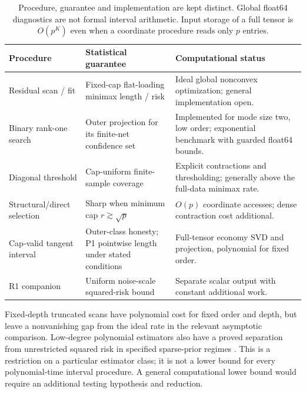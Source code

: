 \documentclass[11pt]{article}
\begin{document}
\begin{table}[t]\small\centering
\begin{tabularx}{\textwidth}{@{}lYY@{}}\toprule
Procedure & Statistical guarantee & Computational status \\\midrule
Residual scan / fit & Fixed-cap flat-loading minimax length / risk & Ideal global nonconvex optimization; general implementation open.\\
Binary rank-one search & Outer projection for its finite-net confidence set & Implemented for mode size two, low order; exponential benchmark with guarded float64 bounds.\\
Diagonal threshold & Cap-uniform finite-sample coverage & Explicit contractions and thresholding; generally above the full-data minimax rate.\\
Structural/direct selection & Sharp when minimum cap $r\gtrsim\sqrt p$ & $O(p)$ coordinate accesses; dense contraction cost additional.\\
Cap-valid tangent interval & Outer-class honesty; P1 pointwise length under stated conditions & Full-tensor economy SVD and projection, polynomial for fixed order.\\
R1 companion & Uniform noise-scale squared-risk bound & Separate scalar output with constant additional work.\\\bottomrule
\end{tabularx}
\caption{Procedure, guarantee and implementation are kept distinct. Global float64 diagnostics are not formal interval arithmetic. Input storage of a full tensor is $O(p^K)$ even when a coordinate procedure reads only $p$ entries.}\label{tab:methods}
\end{table}

Fixed-depth truncated scans have polynomial cost for fixed order and depth, but leave a nonvanishing gap from the ideal rate in the relevant asymptotic comparison. Low-degree polynomial estimators also have a proved separation from unrestricted squared risk in specified sparse-prior regimes \citep{choo2021}. This is a restriction on a particular estimator class; it is not a lower bound for every polynomial-time interval procedure. A general computational lower bound would require an additional testing hypothesis and reduction.
\end{document}
